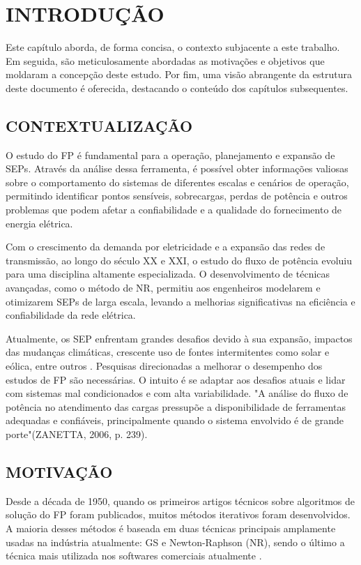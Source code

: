 \chapter{INTRODUÇÃO}\label{cap:intro}
Este capítulo aborda, de forma concisa, o contexto subjacente a este trabalho. Em seguida, são meticulosamente abordadas as motivações e objetivos que moldaram a concepção deste estudo. Por fim, uma visão abrangente da estrutura deste documento é oferecida, destacando o conteúdo dos capítulos subsequentes.

\section{CONTEXTUALIZAÇÃO}
O estudo do \ac{FP} é fundamental para a operação, planejamento e expansão de \acp{SEP}. Através da análise dessa ferramenta, é possível obter informações valiosas sobre o comportamento do sistemas de diferentes escalas e cenários de operação, permitindo identificar pontos sensíveis, sobrecargas, perdas de potência e outros problemas que podem afetar a confiabilidade e a qualidade do fornecimento de energia elétrica. 

Com o crescimento da demanda por eletricidade e a expansão das redes de transmissão, ao longo do século XX e XXI, o estudo do fluxo de potência evoluiu para uma disciplina altamente especializada. O desenvolvimento de técnicas avançadas, como o método de \ac{NR}, permitiu aos engenheiros modelarem e otimizarem \acp{SEP} de larga escala, levando a melhorias significativas na eficiência e confiabilidade da rede elétrica. 


Atualmente, os \ac{SEP} enfrentam grandes desafios devido à sua expansão, impactos das mudanças climáticas, crescente uso de fontes intermitentes como solar e eólica, entre outros \cite{EPE_transmissao_desafios}. Pesquisas direcionadas a melhorar o desempenho dos estudos de \ac{FP} são necessárias. O intuito é se adaptar aos desafios atuais e lidar com sistemas mal condicionados e com alta variabilidade. "A análise do fluxo de potência no atendimento das cargas pressupõe a disponibilidade de ferramentas adequadas e confiáveis, principalmente quando o sistema
envolvido é de grande porte"(ZANETTA, 2006, p. 239).


\section{MOTIVAÇÃO}
Desde a década de 1950, quando os primeiros artigos técnicos sobre algoritmos de solução do \ac{FP} foram publicados, muitos métodos iterativos foram desenvolvidos. A maioria desses métodos é baseada em duas técnicas principais amplamente usadas na indústria atualmente: \ac{GS} e Newton-Raphson (\ac{NR}), sendo o último a técnica mais utilizada nos softwares comerciais atualmente \cite{IEEE_standard}.

